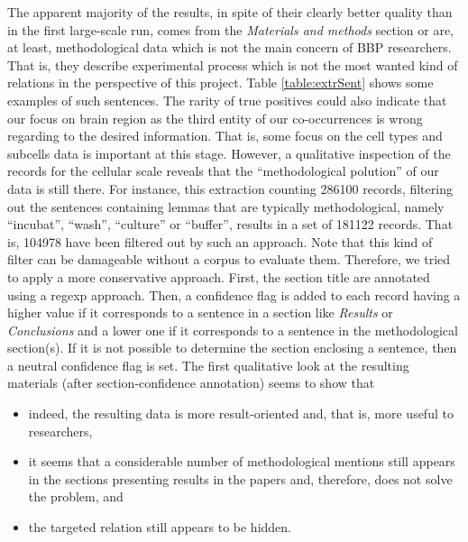 \documentclass{report}
\begin{document}
		The apparent majority of the results, in spite of their clearly better 
		quality than in the first large-scale run, comes from the 
		\textit{Materials and methods} section or are, at least, methodological 
		data which is not the main concern of BBP researchers. That is, they 
		describe experimental process which is not the most wanted kind of 	
		relations in the perspective of this project. Table \ref{table:extrSent} shows some examples of  such 
		sentences. The rarity of true positives could also indicate that our 
		focus on brain region as the third entity of our co-occurrences is wrong 
		regarding to the desired information. That is, some focus on the cell 
		types and subcells data is important at this stage. However, a 
		qualitative inspection of the records for the cellular scale reveals that the ``methodological polution'' of our data is still there. For instance,
                this extraction counting 286100 records, filtering out the sentences containing lemmas that are typically methodological, 
                namely ``incubat'', ``wash'', ``culture'' or ``buffer'', results in a set of 181122 records. That is, 104978 have been filtered out
                by such an approach. Note that this kind of filter can be damageable without a corpus to evaluate them. Therefore, we tried
                to apply a more conservative approach. First, the section title are annotated using a regexp approach. Then, a confidence flag is added to each record
                having a higher value if it corresponds
                to a sentence in a section like \textit{Results} or \textit{Conclusions} and a lower one if it corresponds to a sentence in the 
                methodological section(s). If it is not possible to determine the section enclosing a sentence, then a neutral confidence flag is set.
                The first qualitative look at the resulting materials (after section-confidence annotation)
                seems to show that
                \begin{itemize}
					\item indeed, the resulting data is more result-oriented and, that is, more useful to researchers,
					\item it seems that a considerable number of methodological mentions still appears in the sections presenting results in the papers 
                and, therefore, does not solve the problem, and
					\item the targeted relation still appears to be hidden.
                \end{itemize}
                
\end{document}
